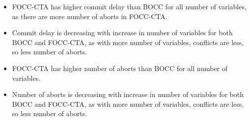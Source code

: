 \documentclass[12pt]{article}
\begin{document}
\begin{itemize}
    \item FOCC-CTA has higher commit delay than BOCC for all number of variables, as there are more number of aborts in FOCC-CTA.
    \item Commit delay is decreasing with increase in number of variables for both BOCC and FOCC-CTA, as with more number of variables, conflicts are less, so less number of aborts.
    \item FOCC-CTA has higher number of aborts than BOCC for all number of variables.
    \item Number of aborts is decreasing with increase in number of variables for both BOCC and FOCC-CTA, as with more number of variables, conflicts are less, so less number of aborts.
\end{itemize}
\end{document}
